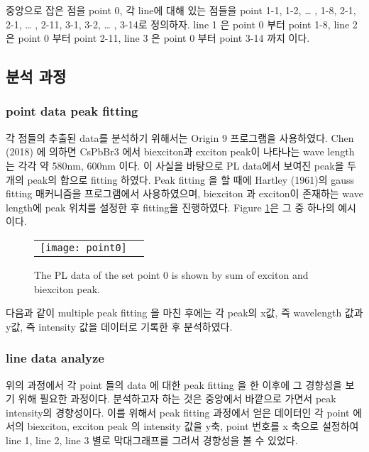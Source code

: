 중앙으로 잡은 점을 point 0, 각 line에 대해 있는 점들을 point 1-1, 1-2, … , 1-8, 2-1, 2-1, … , 2-11, 3-1, 3-2, … , 3-14로 정의하자. line 1 은 point 0 부터 point 1-8, line 2 은 point 0 부터 point 2-11, line 3 은 point 0 부터 point 3-14 까지 이다. 

\subsection{분석 과정}
\subsubsection{point data peak fitting}
각 점들의 추출된 data를 분석하기 위해서는 Origin 9 프로그램을 사용하였다. Chen (2018) 에 의하면 CsPbBr3 에서 biexciton과 exciton peak이 나타나는 wave length 는 각각 약 580nm, 600nm 이다\cite{chen2018room}. 이 사실을 바탕으로 PL data에서 보여진 peak을 두개의 peak의 합으로 fitting 하였다. Peak fitting 을 할 때에 Hartley (1961)의 gauss fitting 매커니즘을 프로그램에서 사용하였으며, biexciton 과 exciton이 존재하는 wave length에 peak 위치를 설정한 후 fitting을 진행하였다\cite{hartley1961modified}. Figure \ref{fig:point0}은 그 중 하나의 예시이다.
\begin{figure}[H]
	\begin{center}
		\begin{tabular}{cc}
			\texttt{[image: point0]}
		\end{tabular}
	\end{center}
	\caption{The PL data of the set point 0 is shown by sum of exciton and biexciton peak.}
	\label{fig:point0}  
\end{figure}
다음과 같이 multiple peak fitting 을 마친 후에는 각 peak의 x값, 즉 wavelength 값과 y값, 즉 intensity 값을 데이터로 기록한 후 분석하였다.
\subsubsection{line data analyze}
위의 과정에서 각 point 들의 data 에 대한 peak fitting 을 한 이후에 그 경향성을 보기 위해 필요한 과정이다. 분석하고자 하는 것은 중앙에서 바깥으로 가면서 peak intensity의 경향성이다. 이를 위해서 peak fitting 과정에서 얻은 데이터인 각 point 에서의 biexciton, exciton peak 의 intensity 값을 y축, point 번호를 x 축으로 설정하여  line 1, line 2, line 3 별로 막대그래프를 그려서 경향성을 볼 수 있었다.
